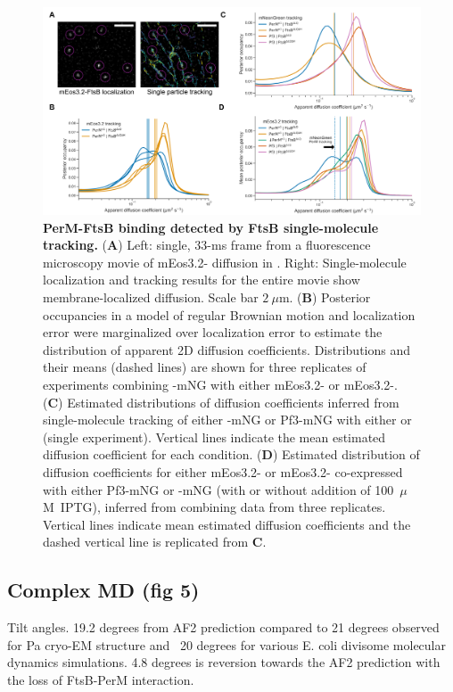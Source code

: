 \documentclass[pdflatex,sn-basic]{sn-jnl}%
\begin{document}
\begin{figure}[h]
\centering
\includegraphics[width=1.0\textwidth]{../figures/fig4.png}
\caption{\textbf{PerM-FtsB binding detected by FtsB single-molecule tracking.} (\textbf{A}) Left: single, 33-ms frame from a fluorescence microscopy movie of mEos3.2-\ftsbdLQ{} diffusion in \ec{}. Right: Single-molecule localization and tracking results for the entire movie show membrane-localized diffusion. Scale bar $2~\mu$m. (\textbf{B}) Posterior occupancies in a model of regular Brownian motion and localization error were marginalized over localization error to estimate the distribution of apparent 2D diffusion coefficients. Distributions and their means (dashed lines) are shown for three replicates of experiments combining \permN{}-mNG with either mEos3.2-\ftsbdLQ{} or mEos3.2-\ftsbdLQdH{}. (\textbf{C}) Estimated distributions of diffusion coefficients inferred from single-molecule tracking of either \permN{}-mNG or Pf3-mNG with either \ftsbdLQ{} or \ftsbdLQdH{} (single experiment). Vertical lines indicate the mean estimated diffusion coefficient for each condition. (\textbf{D}) Estimated distribution of diffusion coefficients for either mEos3.2-\ftsbdLQ{} or mEos3.2-\ftsbdLQdH{} co-expressed with either Pf3-mNG or \permN{}-mNG (with or without addition of 100~$\mu$M~IPTG), inferred from combining data from three replicates. Vertical lines indicate mean estimated diffusion coefficients and the dashed vertical line is replicated from \textbf{C}.}\label{fig4}
\end{figure}

\subsection{Complex MD (fig 5)}

Tilt angles.
19.2 degrees from AF2 prediction compared to 21 degrees observed for Pa cryo-EM structure and ~20 degrees for various E. coli divisome molecular dynamics simulations.
4.8 degrees is reversion towards the AF2 prediction with the loss of FtsB-PerM interaction.
\end{document}
